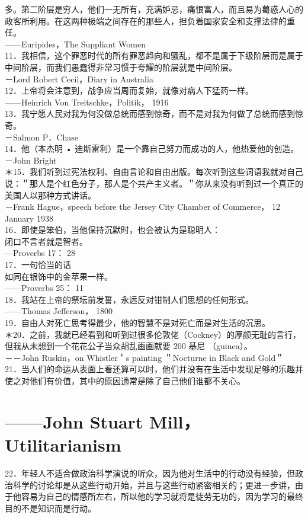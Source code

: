 多。第二阶层是穷人，他们一无所有，充满妒忌，痛恨富人，而且易为薥惑人心的政客所利用。在这两种极端之间存在的那些人，担负着国家安全和支撑法律的重任。\\
——Euripides，The Suppliant Women\\
11．我相信，这个罪恶时代的所有罪恶趋向和骚乱，都不是属于下级阶层而是属于中间阶层，而我们愚蠢得非常习惯于夸耀的阶层就是中间阶层。\\
－Lord Robert Cecil，Diary in Australia\\
12．上帝将会注意到，战争应当周而复始，就像对病人下猛药一样。\\
——Heinrich Von Treitschke，Politik， 1916\\
13．我宁愿人民对我为何没做总统而感到惊奇，而不是对我为何做了总统而感到惊奇。\\
－Salmon P．Chase\\
14．他（本杰明 • 迪斯雷利）是一个靠自己努力而成功的人，他热爱他的创造。\\
－John Bright\\
＊15．我们听到过宪法权利、自由言论和自由出版。每次听到这些词语我就对自己说：＂那人是个红色分子，那人是个共产主义者。＂你从来没有听到过一个真正的美国人以那种方式讲话。\\
－Frank Hague，speech before the Jersey City Chamber of Commerce， 12 January 1938\\
16．即使是笨伯，当他保持沉默时，也会被认为是聪明人：\\
闭口不言者就是智者。\\
—Proverbs 17： 28\\
17．一句恰当的话\\
如同在银饰中的金苹果一样。\\
——Proverbs 25： 11\\
18．我站在上帝的祭坛前发誓，永远反对钳制人们思想的任何形式。\\
——Thomas Jefferson， 1800\\
19．自由人对死亡思考得最少，他的智慧不是对死亡而是对生活的沉思。\\
＊20．之前，我就已经看到和听到过很多伦敦佬（Cockney）的厚颜无耻的言行，但我从未想到一个花花公子当众胡乱画画就要 200 基尼 （guinea）。\\
－－John Ruskin，on Whistler＇s painting ＂Nocturne in Black and Gold＂\\
21．当人们的命运从表面上看还算可以时，他们并没有在生活中发现足够的乐趣并使之对他们有价值，其中的原因通常是除了自己他们谁都不关心。

\section*{——John Stuart Mill，Utilitarianism}
22．年轻人不适合做政治科学演说的听众，因为他对生活中的行动没有经验，但政治科学的讨论却是从这些行动开始，并且与这些行动紧密相关的；更进一步讲，由于他容易为自己的情感所左右，所以他的学习就将是徒劳无功的，因为学习的最终目的不是知识而是行动。

